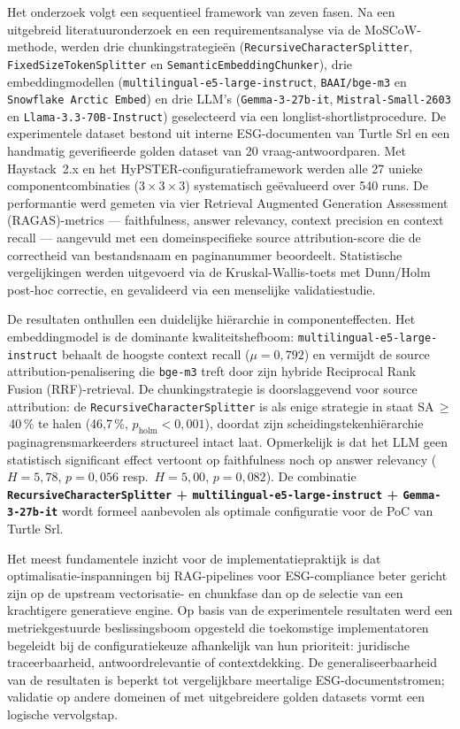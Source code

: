 Het onderzoek volgt een sequentieel framework van zeven fasen. Na een uitgebreid literatuuronderzoek en een requirementsanalyse via de MoSCoW-methode, werden drie chunkingstrategieën (\texttt{RecursiveCharacterSplitter}, \texttt{FixedSizeTokenSplitter} en \texttt{SemanticEmbeddingChunker}), drie embeddingmodellen (\texttt{multilingual-e5-large-instruct}, \texttt{BAAI/bge-m3} en \texttt{Snowflake Arctic Embed}) en drie LLM's (\texttt{Gemma-3-27b-it}, \texttt{Mistral-Small-2603} en \texttt{Llama-3.3-70B-Instruct}) geselecteerd via een longlist-shortlistprocedure. De experimentele dataset bestond uit interne ESG-documenten van Turtle Srl en een handmatig geverifieerde golden dataset van 20 vraag-antwoordparen. Met Haystack~2.x en het HyPSTER-configuratieframework werden alle 27 unieke componentcombinaties ($3 \times 3 \times 3$) systematisch geëvalueerd over 540 runs. De performantie werd gemeten via vier Retrieval Augmented Generation Assessment (RAGAS)-metrics — faithfulness, answer relevancy, context precision en context recall — aangevuld met een domeinspecifieke source attribution-score die de correctheid van bestandsnaam en paginanummer beoordeelt. Statistische vergelijkingen werden uitgevoerd via de Kruskal-Wallis-toets met Dunn/Holm post-hoc correctie, en gevalideerd via een menselijke validatiestudie.

De resultaten onthullen een duidelijke hiërarchie in componenteffecten. Het embeddingmodel is de dominante kwaliteitshefboom: \texttt{multilingual-e5-large-instruct} behaalt de hoogste context recall ($\mu = 0{,}792$) en vermijdt de source attribution-penalisering die \texttt{bge-m3} treft door zijn hybride Reciprocal Rank Fusion (RRF)-retrieval. De chunkingstrategie is doorslaggevend voor source attribution: de \texttt{RecursiveCharacterSplitter} is als enige strategie in staat SA\,$\geq$\,40\,\% te halen (46{,}7\,\%, $p_{\text{holm}} < 0{,}001$), doordat zijn scheidingstekenhiërarchie paginagrensmarkeerders structureel intact laat. Opmerkelijk is dat het LLM geen statistisch significant effect vertoont op faithfulness noch op answer relevancy ($H = 5{,}78$, $p = 0{,}056$ resp.\ $H = 5{,}00$, $p = 0{,}082$). De combinatie \textbf{\texttt{RecursiveCharacterSplitter} + \texttt{multilingual-e5-large-instruct} + \texttt{Gemma-3-27b-it}} wordt formeel aanbevolen als optimale configuratie voor de PoC van Turtle Srl.

Het meest fundamentele inzicht voor de implementatiepraktijk is dat optimalisatie-inspanningen bij RAG-pipelines voor ESG-compliance beter gericht zijn op de upstream vectorisatie- en chunkfase dan op de selectie van een krachtigere generatieve engine. Op basis van de experimentele resultaten werd een metriekgestuurde beslissingsboom opgesteld die toekomstige implementatoren begeleidt bij de configuratiekeuze afhankelijk van hun prioriteit: juridische traceerbaarheid, antwoordrelevantie of contextdekking. De generaliseerbaarheid van de resultaten is beperkt tot vergelijkbare meertalige ESG-documentstromen; validatie op andere domeinen of met uitgebreidere golden datasets vormt een logische vervolgstap.
